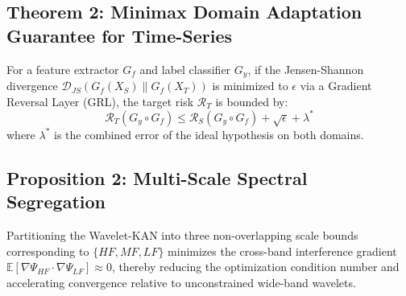 \subsection{Theorem 2: Minimax Domain Adaptation Guarantee for Time-Series}
\begin{theorem}
For a feature extractor $G_f$ and label classifier $G_y$, if the Jensen-Shannon divergence $\mathcal{D}_{JS} \left( G_f(X_S) \| G_f(X_T) \right)$ is minimized to $\epsilon$ via a Gradient Reversal Layer (GRL), the target risk $\mathcal{R}_T$ is bounded by:
$$ \mathcal{R}_T(G_y \circ G_f) \leq \mathcal{R}_S(G_y \circ G_f) + \sqrt{\epsilon} + \lambda^* $$
where $\lambda^*$ is the combined error of the ideal hypothesis on both domains.
\end{theorem}

\subsection{Proposition 2: Multi-Scale Spectral Segregation}
\begin{proposition}
Partitioning the Wavelet-KAN into three non-overlapping scale bounds corresponding to $\{HF, MF, LF\}$ minimizes the cross-band interference gradient $\mathbb{E} [\nabla \Psi_{HF} \cdot \nabla \Psi_{LF}] \approx 0$, thereby reducing the optimization condition number and accelerating convergence relative to unconstrained wide-band wavelets.
\end{proposition}
